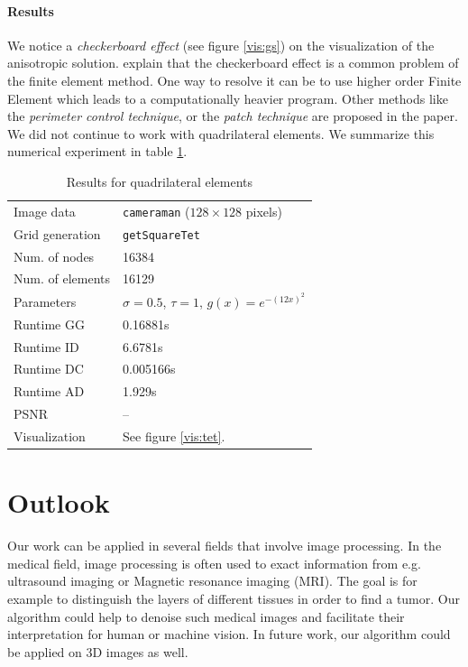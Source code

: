 \documentclass{report}
\begin{document}
\paragraph{Results}

We notice a \emph{checkerboard effect} (see figure \ref{vis:gs}) on the visualization of the anisotropic solution. \cite{shukla2013} explain that the checkerboard effect is a common problem of the finite element method. One way to resolve it can be to use higher order Finite Element which leads to a computationally heavier program. Other methods like the \emph{perimeter control technique}, or the \emph{patch technique} are proposed in the paper. We did not continue to work with quadrilateral elements. We summarize this numerical experiment in table \ref{res:tet}.

\begin{table}[h]
	\centering
	\begin{tabular}{|ll}
		Image data & \texttt{cameraman} ($128 \times 128$ pixels) \\
		Grid generation & \texttt{getSquareTet} \\
		Num. of nodes & 16384 \\
		Num. of elements & 16129 \\
		Parameters & $\sigma=0.5$, $\tau=1$, $g(x) = e^{-(12 x)^2}$ \\
		Runtime GG & 0.16881s \\
		Runtime ID & 6.6781s \\
		Runtime DC & 0.005166s \\
		Runtime AD & 1.929s \\
		PSNR & -- \\
		Visualization & See figure \ref{vis:tet}. \\
	\end{tabular}
	\caption{Results for quadrilateral elements}
	\label{res:tet}
\end{table}


\section{Outlook}

Our work can be applied in several fields that involve image processing. In the medical field, image processing is often used to exact information from e.g. ultrasound imaging or Magnetic resonance imaging (MRI). The goal is for example to distinguish the layers of different tissues in order to find a tumor. Our algorithm could help to denoise such medical images and facilitate their interpretation for human or machine vision. In future work, our algorithm could be applied on 3D images as well.
\end{document}
